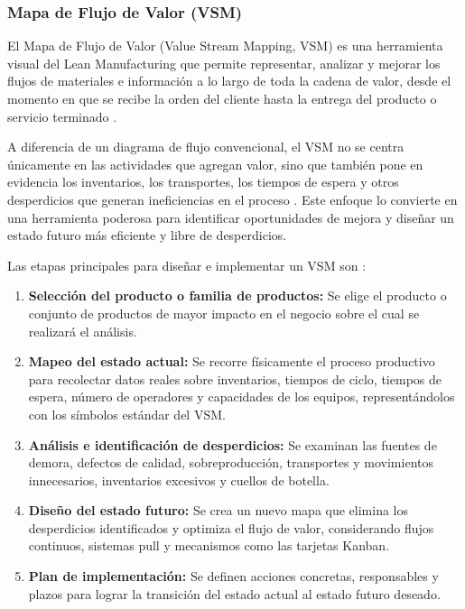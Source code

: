 \documentclass[12pt, letterpaper]{article}
\begin{document}
\subsubsection{Mapa de Flujo de Valor (VSM)}

El Mapa de Flujo de Valor (Value Stream Mapping, VSM) es una herramienta visual del Lean
Manufacturing que permite representar, analizar y mejorar los flujos de materiales e información
a lo largo de toda la cadena de valor, desde el momento en que se recibe la orden del cliente
hasta la entrega del producto o servicio terminado \cite{kaizen2025}.

A diferencia de un diagrama de flujo convencional, el VSM no se centra únicamente en las
actividades que agregan valor, sino que también pone en evidencia los inventarios, los transportes,
los tiempos de espera y otros desperdicios que generan ineficiencias en el proceso \cite{kaizen2025}.
Este enfoque lo convierte en una herramienta poderosa para identificar oportunidades de mejora y
diseñar un estado futuro más eficiente y libre de desperdicios.

Las etapas principales para diseñar e implementar un VSM son \cite{kaizen2025,adnlean2024}:

\begin{enumerate}[leftmargin=1.5em, itemsep=2pt]
  \item \textbf{Selección del producto o familia de productos:} Se elige el producto o conjunto de
        productos de mayor impacto en el negocio sobre el cual se realizará el análisis.
  \item \textbf{Mapeo del estado actual:} Se recorre físicamente el proceso productivo para
        recolectar datos reales sobre inventarios, tiempos de ciclo, tiempos de espera, número
        de operadores y capacidades de los equipos, representándolos con los símbolos estándar del VSM.
  \item \textbf{Análisis e identificación de desperdicios:} Se examinan las fuentes de demora,
        defectos de calidad, sobreproducción, transportes y movimientos innecesarios, inventarios
        excesivos y cuellos de botella.
  \item \textbf{Diseño del estado futuro:} Se crea un nuevo mapa que elimina los desperdicios
        identificados y optimiza el flujo de valor, considerando flujos continuos, sistemas pull
        y mecanismos como las tarjetas Kanban.
  \item \textbf{Plan de implementación:} Se definen acciones concretas, responsables y plazos para
        lograr la transición del estado actual al estado futuro deseado.
\end{enumerate}
\end{document}
